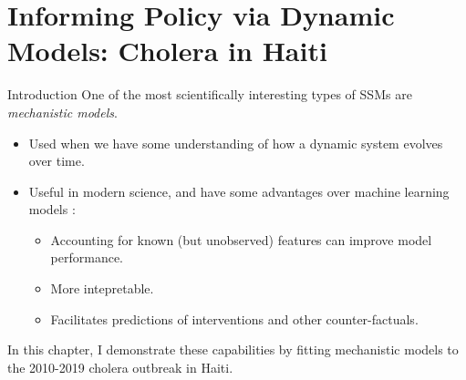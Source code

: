 \documentclass[aspectratio=169]{beamer}\usepackage[]{graphicx}\usepackage[]{xcolor}
\begin{document}
\section{Informing Policy via Dynamic Models: Cholera in Haiti}

\begin{frame}{Introduction}
  One of the most scientifically interesting types of SSMs are \emph{mechanistic models}.
  
  \begin{itemize}
    \item Used when we have some understanding of how a dynamic system evolves over time. 
    \item Useful in modern science, and have some advantages over machine learning models \citep{baker18,hogg24}:
    \begin{itemize}
      \item Accounting for known (but unobserved) features can improve model performance. 
      \item More intepretable. 
      \item Facilitates predictions of interventions and other counter-factuals. 
    \end{itemize}
  \end{itemize}
  \pause
  In this chapter, I demonstrate these capabilities by fitting mechanistic models to the 2010-2019 cholera outbreak in Haiti. 
\end{frame}
\end{document}
